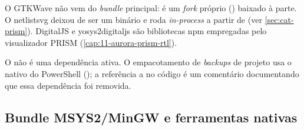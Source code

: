 O GTKWave não vem do \emph{bundle} principal: é um \emph{fork} próprio
() baixado à parte. O netlistsvg deixou de ser um binário
e roda \emph{in-process} a partir de  (ver
\autoref{sec:cat-prism}). DigitalJS e yosys2digitaljs são bibliotecas npm
empregadas pelo visualizador PRISM (\autoref{cap:11-aurora-prism-rtl}).

\begin{nota}
O  não é uma dependência ativa. O empacotamento de \emph{backups}
de projeto usa o  nativo do PowerShell
(); a referência a  no código é um comentário
documentando que essa dependência foi removida.
\end{nota}

\subsection{Bundle MSYS2/MinGW e ferramentas nativas}

